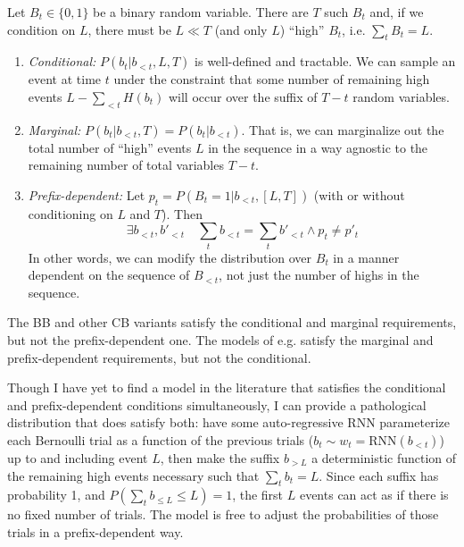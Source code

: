 \documentclass{article}
\begin{document}
Let $B_t \in \{0,1\}$ be a binary random variable. There are $T$ such $B_t$
and, if we condition on $L$, there must be $L \ll T$ (and only $L$) ``high''
$B_t$, i.e. $\sum_t B_t = L$.
%
\begin{enumerate}
    \item \emph{Conditional:} $P(b_t|b_{<t}, L, T)$ is well-defined and
          tractable. We can sample an event at time $t$ under the constraint
          that some number of remaining high events $L - \sum_{<t} H(b_t)$ will
          occur over the suffix of $T - t$ random variables.
    \item \emph{Marginal:} $P(b_t|b_{<t}, T) = P(b_t|b_{<t})$. That is, we can
          marginalize out the total number of ``high'' events $L$ in the
          sequence in a way agnostic to the remaining number of total variables
          $T - t$.
    \item \emph{Prefix-dependent:} Let $p_t = P(B_t = 1|b_{<t}, [L, T])$
          (with or without conditioning on $L$ and $T$). Then
          \begin{equation*}
            \exists b_{<t}, b'_{<t} \quad
                \sum_t b_{<t} = \sum_t b'_{<t} \land p_t \neq p'_t
          \end{equation*}
          In other words, we can modify the distribution over $B_t$ in a manner
          dependent on the sequence of $B_{<t}$, not just the number of highs
          in the sequence.
\end{enumerate}
%
The BB and other CB variants satisfy the conditional and marginal requirements,
but not the prefix-dependent one. The models of e.g.
\citet{luoLearningOnlineAlignments2017,raffelOnlineLineartimeAttention2017}
satisfy the marginal and prefix-dependent requirements, but not the
conditional.

Though I have yet to find a model in the literature that satisfies the
conditional and prefix-dependent conditions simultaneously, I can provide a
pathological distribution that does satisfy both: have some auto-regressive RNN
parameterize each Bernoulli trial as a function of the previous trials ($b_t
\sim w_t = \text{RNN}(b_{<t})$) up to and including event $L$, then make the
suffix $b_{>L}$ a deterministic function of the remaining high events necessary
such that $\sum_t b_t = L$. Since each suffix has probability 1, and $P(\sum_t
b_{\leq L} \leq L) = 1$, the first $L$ events can act as if there is no fixed
number of trials. The model is free to adjust the probabilities of those trials
in a prefix-dependent way.
\end{document}
